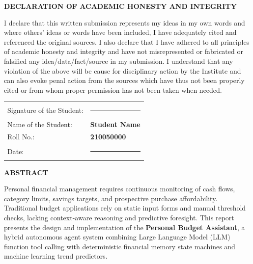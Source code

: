 \documentclass[12pt,a4paper,oneside]{report}
\begin{document}
\thispagestyle{plain}
\begin{center}
    \Large \textbf{DECLARATION OF ACADEMIC HONESTY AND INTEGRITY}
\end{center}

\vspace{0.8cm}

\noindent I declare that this written submission represents my ideas in my own words and where others' ideas or words have been included, I have adequately cited and referenced the original sources. I also declare that I have adhered to all principles of academic honesty and integrity and have not misrepresented or fabricated or falsified any idea/data/fact/source in my submission. I understand that any violation of the above will be cause for disciplinary action by the Institute and can also evoke penal action from the sources which have thus not been properly cited or from whom proper permission has not been taken when needed.

\vspace{2.5cm}

\noindent \begin{tabular}{@{}l l}
Signature of the Student: & \rule{6cm}{0.4pt} \\[0.8cm]
Name of the Student: & \textbf{Student Name} \\[0.3cm]
Roll No.: & \textbf{210050000} \\[0.3cm]
Date: & \rule{4cm}{0.4pt} \\
\end{tabular}

\newpage

\thispagestyle{plain}
\begin{center}
    \Large \textbf{ABSTRACT}
\end{center}

\vspace{0.5cm}

\noindent Personal financial management requires continuous monitoring of cash flows, category limits, savings targets, and prospective purchase affordability. Traditional budget applications rely on static input forms and manual threshold checks, lacking context-aware reasoning and predictive foresight. This report presents the design and implementation of the \textbf{Personal Budget Assistant}, a hybrid autonomous agent system combining Large Language Model (LLM) function tool calling with deterministic financial memory state machines and machine learning trend predictors.
\end{document}

